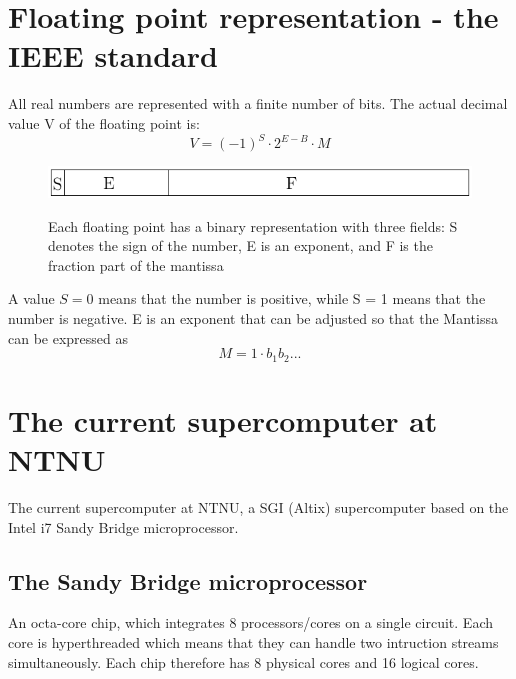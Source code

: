 \documentclass{article}
\begin{document}
\section{Floating point representation - the IEEE standard}
All real numbers are represented with a finite number of bits. The actual decimal value V of the floating point is: 
\begin{equation}
V = (-1)^S \cdot 2^{E-B} \cdot M
\end{equation}
\begin{figure}[H]
\includegraphics[scale=1.0]{ieee}
\label{floatingpoint}
\caption{Each floating point has a binary representation with three fields: S denotes the sign of the number, E is an exponent, and F is the fraction part of the mantissa}
\end{figure}
A value $S = 0$ means that the number is positive, while S = 1 means that the number is negative. E is an exponent that can be adjusted so that the Mantissa can be expressed as 
\begin{equation}
M = 1 \cdot b_{1} b_{2} ...
\end{equation}

\section{The current supercomputer at NTNU}
The current supercomputer at NTNU, a SGI (Altix) supercomputer based on the Intel i7 Sandy Bridge microprocessor.
\subsection{The Sandy Bridge microprocessor}
An octa-core chip, which integrates 8 processors/cores on a single circuit. Each core is hyperthreaded which means that they can handle two intruction streams simultaneously. Each chip therefore has 8 physical cores and 16 logical cores.
\end{document}
